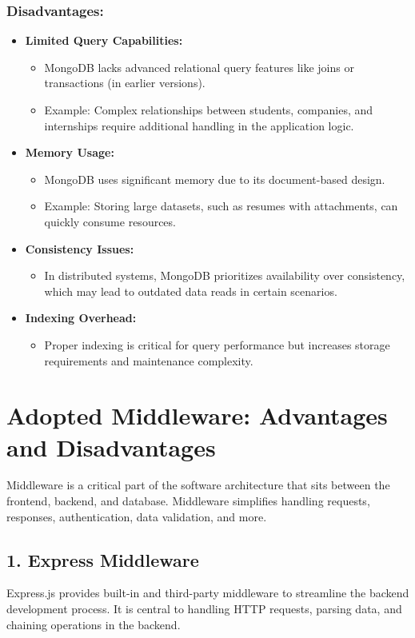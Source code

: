 \subsubsection*{Disadvantages:}
\begin{itemize}
    \item \textbf{Limited Query Capabilities:}
    \begin{itemize}
        \item MongoDB lacks advanced relational query features like joins or transactions (in earlier versions).
        \item Example: Complex relationships between students, companies, and internships require additional handling in the application logic.
    \end{itemize}
    \item \textbf{Memory Usage:}
    \begin{itemize}
        \item MongoDB uses significant memory due to its document-based design.
        \item Example: Storing large datasets, such as resumes with attachments, can quickly consume resources.
    \end{itemize}
    \item \textbf{Consistency Issues:}
    \begin{itemize}
        \item In distributed systems, MongoDB prioritizes availability over consistency, which may lead to outdated data reads in certain scenarios.
    \end{itemize}
    \item \textbf{Indexing Overhead:}
    \begin{itemize}
        \item Proper indexing is critical for query performance but increases storage requirements and maintenance complexity.
    \end{itemize}
\end{itemize}

\section{Adopted Middleware: Advantages and Disadvantages}
Middleware is a critical part of the software architecture that sits between the frontend, backend, and database. Middleware simplifies handling requests, responses, authentication, data validation, and more.

\subsection*{1. Express Middleware}
Express.js provides built-in and third-party middleware to streamline the backend development process. It is central to handling HTTP requests, parsing data, and chaining operations in the backend.

